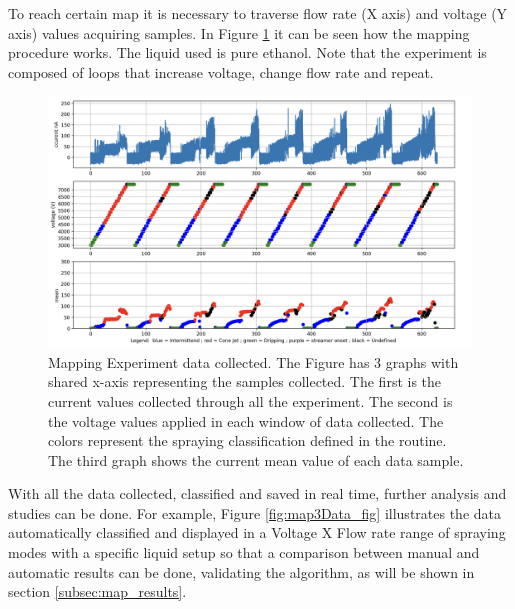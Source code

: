     \vspace{2cm}
    To reach certain map it is necessary to traverse flow rate (X axis) and voltage (Y axis) values acquiring samples.
    In Figure \ref{fig:map2Data_fig} it can be seen how the mapping procedure works. The liquid used is pure ethanol. 
    Note that the experiment is composed of loops that increase voltage, change flow rate and repeat.

    \begin{figure}[H]
        \center
        \includegraphics[width=16cm]{Figuras/report2/map2Data.png}
        \caption{Mapping Experiment data collected. The Figure has 3 graphs with shared x-axis representing the samples collected. The first is the current values collected through all the experiment.
        The second is the voltage values applied in each window of data collected. The colors represent the spraying classification defined in the routine.
        The third graph shows the current mean value of each data sample.}
        \label{fig:map2Data_fig}
    \end{figure}

    With all the data collected, classified and saved in real time, further analysis and studies can be done. 
    For example, Figure \ref{fig:map3Data_fig} illustrates the data automatically classified and displayed in a Voltage X Flow rate range of spraying modes with a specific liquid setup so that a comparison between manual and automatic results can be done, validating the algorithm, as will be shown in section \ref{subsec:map_results}.

